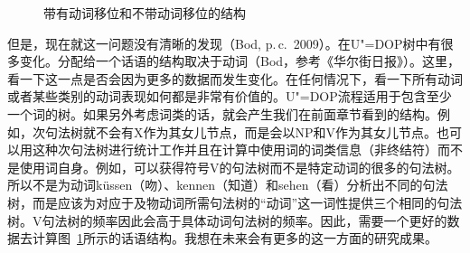\begin{exe}
\begin{xlist}[iv.]
\begin{exe}
\begin{xlist}[iv.]
\begin{figure}
\caption{\label{Abbildung-DOP-Verbbewegung}带有动词移位和不带动词移位的结构}
\end{figure}%
但是，现在就这一问题没有清晰的发现（Bod, p.\,c.\ 2009）。在U"=DOP树中有很多变化。分配给一个话语的结构取决于动词（Bod，参考《华尔街日报》）。这里，看一下这一点是否会因为更多的数据而发生变化。在任何情况下，看一下所有动词或者某些类别的动词表现如何都是非常有价值的。U"=DOP流程适用于包含至少一个词的树。如果另外考虑词类的话，就会产生我们在前面章节看到的结构。例如，次句法树就不会有X作为其女儿节点，而是会以NP和V作为其女儿节点。也可以用这种次句法树进行统计工作并且在计算中使用词的词类信息（非终结符）而不是使用词自身。例如，可以获得符号V的句法树而不是特定动词的很多的句法树。所以不是为动词küssen（吻）、kennen（知道）和sehen（看）分析出不同的句法树，而是应该为对应于及物动词所需句法树的“动词”这一词性提供三个相同的句法树。V句法树的频率因此会高于具体动词句法树的频率。因此，需要一个更好的数据去计算图~\ref{Abbildung-DOP-Verbbewegung}所示的话语结构。我想在未来会有更多的这一方面的研究成果。


\end{xlist}
\end{exe}
\end{xlist}
\end{exe}
